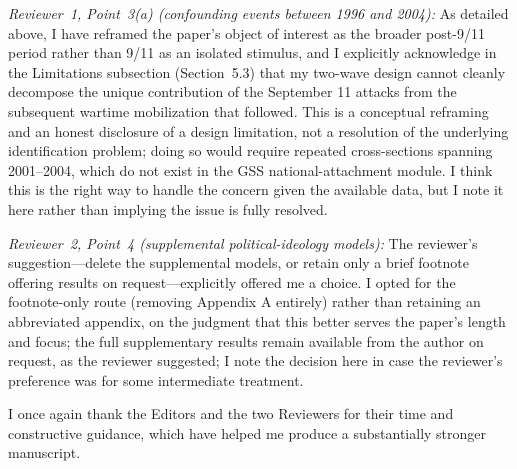 \documentclass[11pt]{article}
\begin{document}
\textit{Reviewer~1, Point~3(a) (confounding events between 1996 and 2004):} As detailed above, I have reframed the paper's object of interest as the broader post-9/11 period rather than 9/11 as an isolated stimulus, and I explicitly acknowledge in the Limitations subsection (Section~5.3) that my two-wave design cannot cleanly decompose the unique contribution of the September 11 attacks from the subsequent wartime mobilization that followed. This is a conceptual reframing and an honest disclosure of a design limitation, not a resolution of the underlying identification problem; doing so would require repeated cross-sections spanning 2001--2004, which do not exist in the GSS national-attachment module. I think this is the right way to handle the concern given the available data, but I note it here rather than implying the issue is fully resolved.

\textit{Reviewer~2, Point~4 (supplemental political-ideology models):} The reviewer's suggestion---delete the supplemental models, or retain only a brief footnote offering results on request---explicitly offered me a choice. I opted for the footnote-only route (removing Appendix A entirely) rather than retaining an abbreviated appendix, on the judgment that this better serves the paper's length and focus; the full supplementary results remain available from the author on request, as the reviewer suggested; I note the decision here in case the reviewer's preference was for some intermediate treatment.

\vspace{12pt}
\noindent I once again thank the Editors and the two Reviewers for their time and constructive guidance, which have helped me produce a substantially stronger manuscript.



\end{document}
